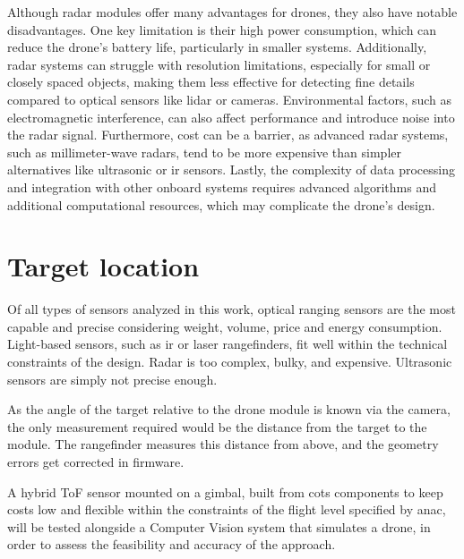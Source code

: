 Although radar modules offer many advantages for drones, they also have notable disadvantages.
One key limitation is their high power consumption, which can reduce the drone's battery life,
particularly in smaller systems. Additionally, radar systems can struggle with resolution limitations,
especially for small or closely spaced objects, making them less effective for detecting fine details
compared to optical sensors like \gls{lidar} or cameras. Environmental factors, such as electromagnetic
interference, can also affect performance and introduce noise into the radar signal. Furthermore,
cost can be a barrier, as advanced radar systems, such as millimeter-wave radars, tend to be more
expensive than simpler alternatives like ultrasonic or \gls{ir} sensors. Lastly, the complexity of
data processing and integration with other onboard systems requires advanced algorithms and additional
computational resources, which may complicate the drone's design.

\section{Target location}

Of all types of sensors analyzed in this work, optical ranging sensors are the most capable and
precise considering weight, volume, price and energy consumption. Light-based sensors, such as
\gls{ir} or laser rangefinders, fit well within the technical constraints of the design. Radar
is too complex, bulky, and expensive. Ultrasonic sensors are simply not precise enough.

As the angle of the target relative to the drone module is known via the camera, the only
measurement required would be the distance from the target to the module. The rangefinder measures
this distance from above, and the geometry errors get corrected in firmware.

A hybrid ToF sensor mounted on a gimbal, built from \gls{cots} components to keep costs low
and flexible within the constraints of the flight level specified by \gls{anac}, will be
tested alongside a Computer Vision system that simulates a drone,
in order to assess the feasibility and accuracy of the approach.
